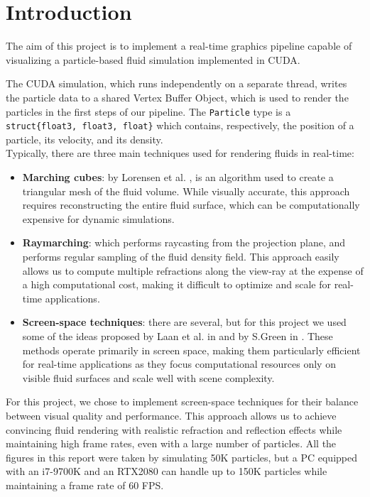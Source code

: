 
\section{Introduction} %

The aim of this project is to implement a real-time graphics pipeline capable of visualizing a particle-based fluid simulation implemented in CUDA.

\noindent
The CUDA simulation, which runs independently on a separate thread, writes the particle data to a shared Vertex Buffer Object, which is used to render the particles in the first steps of our pipeline. The \texttt{Particle} type is a \texttt{struct\{float3, float3, float\}} which contains, respectively, the position of a particle, its velocity, and its density.\\

\noindent
Typically, there are three main techniques used for rendering fluids in real-time:
\begin{itemize}
    \item \textbf{Marching cubes}: by Lorensen et al. \cite{marchingCubes1988}, is an algorithm used to create a triangular mesh of the fluid volume. While visually accurate, this approach requires reconstructing the entire fluid surface, which can be computationally expensive for dynamic simulations.
    \item \textbf{Raymarching}: which performs raycasting from the projection plane, and performs regular sampling of the fluid density field. This approach easily allows us to compute multiple refractions along the view-ray at the expense of a high computational cost, making it difficult to optimize and scale for real-time applications.
    \item \textbf{Screen-space techniques}: there are several, but for this project we used some of the ideas proposed by Laan et al. in \cite{green2009screen} and by S.Green in \cite{green2010GDC}. These methods operate primarily in screen space, making them particularly efficient for real-time applications as they focus computational resources only on visible fluid surfaces and scale well with scene complexity.
\end{itemize}

\noindent
For this project, we chose to implement screen-space techniques for their balance between visual quality and performance. This approach allows us to achieve convincing fluid rendering with realistic refraction and reflection effects while maintaining high frame rates, even with a large number of particles. All the figures in this report were taken by simulating 50K particles, but a PC equipped with an i7-9700K and an RTX2080 can handle up to 150K particles while maintaining a frame rate of 60 FPS.  

